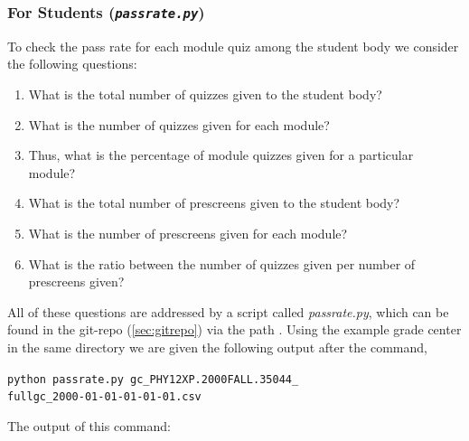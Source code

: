 \documentclass[12pt]{article}
\begin{document}
\subsubsection{For Students (\texttt{\emph{passrate.py}})} \label{sec:fs}

\noindent To check the pass rate for each module quiz among the student body we consider the following questions:

\begin{enumerate}
	\item What is the total number of quizzes given to the student body?
	\item What is the number of quizzes given for each module?
	\item Thus, what is the percentage of module quizzes given for a particular module?
	\item What is the total number of prescreens given to the student body?
	\item What is the number of prescreens given for each module?
	\item What is the ratio between the number of quizzes given per number of prescreens given?
\end{enumerate}

\noindent All of these questions are addressed by a script called \emph{passrate.py}, which can be found in the git-repo (\ref{sec:gitrepo}) via the path . Using the example grade center in the same directory we are given the following output after the command,

\begin{mdframed}[style=CommandFrame]
\texttt{python passrate.py gc\_PHY12XP.2000FALL.35044\_ \\ fullgc\_2000-01-01-01-01-01.csv}
\end{mdframed}

\noindent The output of this command:
\end{document}
